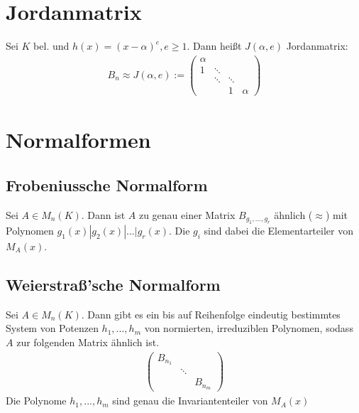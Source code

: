 \section{Jordanmatrix}
\begin{definition}
Sei $K$ bel. und $h(x)=(x-\alpha)^e, e \geq 1$. Dann heißt $J(\alpha,e)$ Jordanmatrix:
\begin{align*}
B_n \approx J(\alpha,e) :=
\begin{pmatrix}
\alpha &        &   &\\
1      & \ddots &   &\\
       & \ddots & \ddots &\\
       &        & 1 & \alpha
\end{pmatrix}
\end{align*}
\end{definition}
\section{Normalformen}
\subsection{Frobeniussche Normalform}
\begin{theorem}
Sei $A \in M_n(K)$. Dann ist $A$ zu genau einer Matrix $B_{g_1,...,g_r}$ ähnlich ($\approx$) mit Polynomen $g_1(x) | g_2(x)| ... | g_r(x)$. Die $g_i$ sind dabei die Elementarteiler von $M_A(x)$.
\end{theorem}
\subsection{Weierstraß'sche Normalform}
\begin{theorem}
Sei $A \in M_n(K)$. Dann gibt es ein bis auf Reihenfolge eindeutig bestimmtes System von Potenzen $h_1,...,h_m$ von normierten, irreduziblen Polynomen, sodass $A$ zur folgenden Matrix ähnlich ist.
\begin{align*}
\begin{pmatrix}
B_{n_1} &        & \\
        & \ddots & \\
        &		  & B_{n_m}
\end{pmatrix}
\end{align*}
Die Polynome $h_1,...,h_m$ sind genau die Invariantenteiler von $M_A(x)$
\end{theorem}

